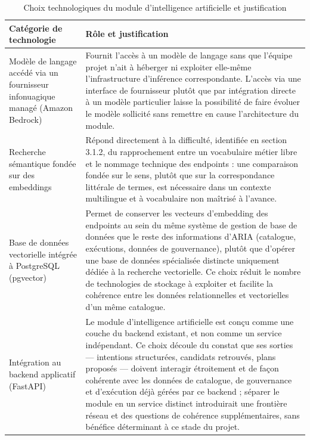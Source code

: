 \begin{table}[H]
\centering
\caption{Choix technologiques du module d'intelligence artificielle et justification}
\label{tab:choix-techno-ia}
\begin{tabularx}{\textwidth}{L{3.6cm}Y}
\hline
{}
\textbf{Catégorie de technologie} & \textbf{Rôle et justification} \\
\hline
Modèle de langage accédé via un fournisseur infonuagique managé (Amazon Bedrock) & Fournit l'accès à un modèle de langage sans que l'équipe projet n'ait à héberger ni exploiter elle-même l'infrastructure d'inférence correspondante. L'accès via une interface de fournisseur plutôt que par intégration directe à un modèle particulier laisse la possibilité de faire évoluer le modèle sollicité sans remettre en cause l'architecture du module. \\
\hline
Recherche sémantique fondée sur des embeddings & Répond directement à la difficulté, identifiée en section 3.1.2, du rapprochement entre un vocabulaire métier libre et le nommage technique des endpoints : une comparaison fondée sur le sens, plutôt que sur la correspondance littérale de termes, est nécessaire dans un contexte multilingue et à vocabulaire non maîtrisé à l'avance. \\
\hline
Base de données vectorielle intégrée à PostgreSQL (pgvector) & Permet de conserver les vecteurs d'embedding des endpoints au sein du même système de gestion de base de données que le reste des informations d'ARIA (catalogue, exécutions, données de gouvernance), plutôt que d'opérer une base de données spécialisée distincte uniquement dédiée à la recherche vectorielle. Ce choix réduit le nombre de technologies de stockage à exploiter et facilite la cohérence entre les données relationnelles et vectorielles d'un même catalogue. \\
\hline
Intégration au backend applicatif (FastAPI) & Le module d'intelligence artificielle est conçu comme une couche du backend existant, et non comme un service indépendant. Ce choix découle du constat que ses sorties — intentions structurées, candidats retrouvés, plans proposés — doivent interagir étroitement et de façon cohérente avec les données de catalogue, de gouvernance et d'exécution déjà gérées par ce backend ; séparer le module en un service distinct introduirait une frontière réseau et des questions de cohérence supplémentaires, sans bénéfice déterminant à ce stade du projet. \\
\hline
\end{tabularx}
\end{table}

